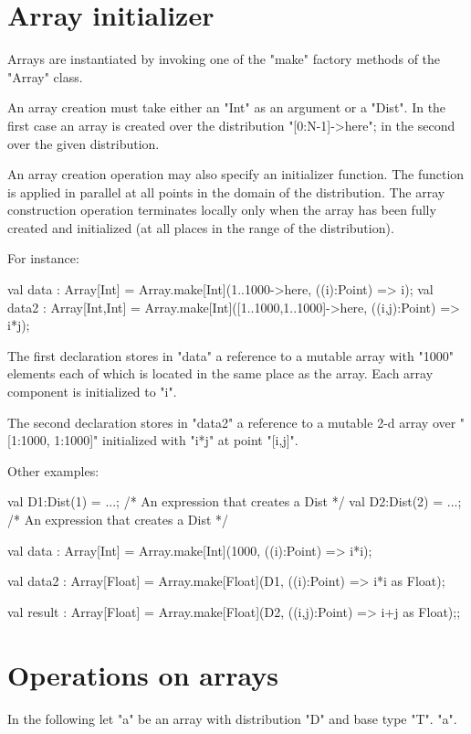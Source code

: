 \section{Array initializer}\label{ArrayInitializer}\label{array!creation}

Arrays are instantiated by invoking one of the \xcd"make" factory
methods of the \xcd"Array" class.

An array creation 
must take either an \xcd"Int" as an argument or a \xcd"Dist". In the first
case an array is created over the distribution \xcd"[0:N-1]->here";
in the second over the given distribution. 

An array creation operation may also specify an initializer
function.
The function is applied in parallel
at all points in the domain of the distribution. The array
construction operation terminates locally only when the array has been
fully created and initialized (at all places in the range of the
distribution).

For instance:
\begin{xten}
val data : Array[Int]
    = Array.make[Int](1..1000->here, ((i):Point) => i);
val data2 : Array[Int,Int]
    = Array.make[Int]([1..1000,1..1000]->here, ((i,j):Point) => i*j);
\end{xten}

{}\noindent 
The first declaration stores in \xcd"data" a reference to a mutable
array with \xcd"1000" elements each of which is located in the
same place as the array. Each array component is initialized to \xcd"i".

The second declaration stores in \xcd"data2" a reference to a mutable
2-d array over \xcd"[1:1000, 1:1000]" initialized with \xcd"i*j"
at point \xcd"[i,j]".

Other examples:
\begin{xten}
val D1:Dist(1) = ...; /* An expression that creates a Dist */
val D2:Dist(2) = ...; /* An expression that creates a Dist */

val data : Array[Int]
    = Array.make[Int](1000, ((i):Point) => i*i);

val data2 : Array[Float]
    = Array.make[Float](D1, ((i):Point) => i*i as Float);

val result : Array[Float]
   = Array.make[Float](D2, ((i,j):Point) => i+j as Float);;
\end{xten}

\section{Operations on arrays}
In the following let \xcd"a" be an array with distribution \xcd"D" and
base type \xcd"T". \xcd"a".

